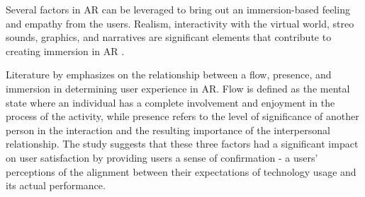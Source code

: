 Several factors in AR can be leveraged to bring out an immersion-based feeling and empathy from the users. Realism, interactivity with the virtual world, streo sounds, graphics, and narratives are significant elements that contribute to creating immersion in AR \cite{marto2022}.

Literature by \cite{immersionAR} emphasizes on the relationship between a flow, presence, and immersion in determining user experience in AR. Flow is defined as the mental state where an individual has a complete involvement and enjoyment in the process of the activity, while presence refers to the level of significance of another person in the interaction and the resulting importance of the interpersonal relationship. The study suggests that these three factors had a significant impact on user satisfaction by providing users a sense of confirmation - a users' perceptions of the alignment between their expectations of technology usage and its actual performance.















